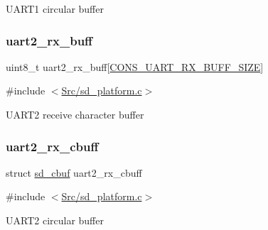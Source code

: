 U\+A\+R\+T1 circular buffer \mbox{\label{group___s_d___platform___variables_ga3c26ef62b04f8b01eb21a42368e16071}} 
\subsubsection{\texorpdfstring{uart2\+\_\+rx\+\_\+buff}{uart2\_rx\_buff}}
{\footnotesize\ttfamily uint8\+\_\+t uart2\+\_\+rx\+\_\+buff\mbox{[}\mbox{\hyperlink{group___s_d___platform___defines_gaf42bf8bfc63a6cca851012eeb8e25b52}{C\+O\+N\+S\+\_\+\+U\+A\+R\+T\+\_\+\+R\+X\+\_\+\+B\+U\+F\+F\+\_\+\+S\+I\+ZE}}\mbox{]}}



{\ttfamily \#include $<$\mbox{\hyperlink{sd__platform_8c}{Src/sd\+\_\+platform.\+c}}$>$}

U\+A\+R\+T2 receive character buffer \mbox{\label{group___s_d___platform___variables_ga6727cd344d3e2e695b8a5aff466c529b}} 
\subsubsection{\texorpdfstring{uart2\+\_\+rx\+\_\+cbuff}{uart2\_rx\_cbuff}}
{\footnotesize\ttfamily struct \mbox{\hyperlink{structsd__cbuf}{sd\+\_\+cbuf}} uart2\+\_\+rx\+\_\+cbuff}



{\ttfamily \#include $<$\mbox{\hyperlink{sd__platform_8c}{Src/sd\+\_\+platform.\+c}}$>$}

U\+A\+R\+T2 circular buffer 